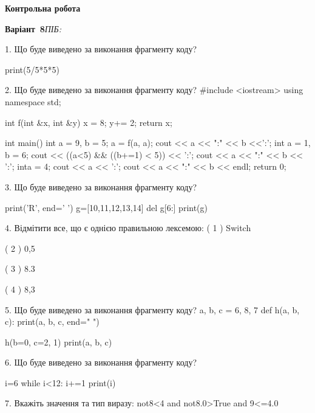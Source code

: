\documentclass[11pt]{article}
\begin{document}
{\large\textbf{Контрольна робота}}

\textbf{Варіант \No\,8}\hfill \textit{ПІБ:}\,\underline{\hspace{60mm}}
\vspace{4mm}

1. Що буде виведено за виконання фрагменту коду?

print(5/5*5*5)
\vspace{5mm}

2. Що буде виведено за виконання фрагменту коду?
#include <iostream>
using namespace std;

int f(int &x, int &y){
    x = 8;
    y+= 2;
    return x;
}

int main(){
    int a = 9, b = 5;
    a = f(a, a);
    cout << a << ":" << b <<':';
    {
        int a = 1, b = 6;
        cout << ((a<5) && ((b+=1) < 5)) << ':';
        cout << a << ":" << b << ':';
    }
    {
        inta = 4;
        cout << a << ':';
    }
    cout << a << ":" << b << endl;
    return 0;
}

\vspace{5mm}

3. Що буде виведено за виконання фрагменту коду?

print('R', end=' ')
g=[10,11,12,13,14]
del g[6:]
print(g)

\vspace{5mm}

4. %
Відмітити все, що є однією правильною лексемою:
( 1 ) Switch

( 2 ) 0,5

( 3 ) 8.3

( 4 ) 8,3
\vspace{5mm}

5. Що буде виведено за виконання фрагменту коду?
a, b, c = 6, 8, 7
def h(a, b, c):
    print(a, b, c, end=" ")

h(b=0, c=2, 1)
print(a, b, c)
\vspace{5mm}

6. Що буде виведено за виконання фрагменту коду?

i=6
while i<12:
    i+=1
print(i)

\vspace{5mm}

7. 
Вкажіть значення та тип виразу:
not8<4 and not8.0>True and 9<=4.0
\vspace{5mm}
\end{document}
